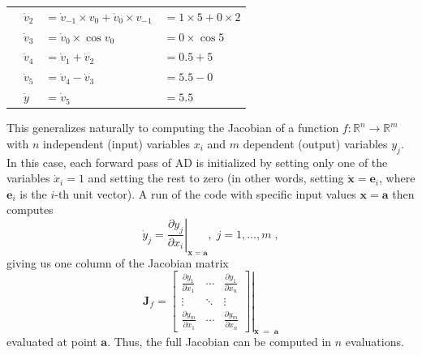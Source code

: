 \documentclass[twoside,11pt]{article}
\begin{document}
\begin{table}
\begin{minipage}[c]{0.52\textwidth}
{\begin{tabularx}{\textwidth}{p{0.2mm}p{2mm}p{28mm}X}
      & $\dot{v}_2$ & $=\dot{v}_{-1} \times v_0 + \dot{v}_0 \times v_{-1}$ & $=1 \times 5 + 0 \times 2$\\
      & $\dot{v}_3$ & $=\dot{v}_0 \times \cos{v_0}$ & $=0 \times \cos{5}$\\
      & $\dot{v}_4$ & $=\dot{v}_1+\dot{v}_2$ & $=0.5+5$\\
      & $\dot{v}_5$ & $=\dot{v}_4-\dot{v}_3$ & $=5.5-0$\\
      \cmidrule{2-4}
      & \boldmath$\dot{y}$ & \boldmath$=\dot{v}_5$ & \boldmath$=5.5$\\
      \bottomrule
      \end{tabularx}}
  \end{minipage}
\end{table}

This generalizes naturally to computing the Jacobian of a function $f : \mathbb{R}^n \to \mathbb{R}^m$ with $n$ independent (input) variables $x_i$ and $m$ dependent (output) variables $y_j$. In this case, each forward pass of AD is initialized by setting only one of the variables $\dot{x}_i=1$ and setting the rest to zero (in other words, setting $\dot{\mathbf{x}} = \mathbf{e}_i$, where $\mathbf{e}_i$ is the $i$-th unit vector). A run of the code with specific input values $\mathbf{x}=\mathbf{a}$ then computes
\begin{equation*}
\dot{y}_j = \left.\frac{\partial y_j}{\partial x_i}\right|_{\mathbf{x}=\mathbf{a}},\;j = 1, \dotsc, m\;,
\end{equation*}
giving us one column of the Jacobian matrix
\begin{equation*}
\mathbf{J}_f = \left. \begin{bmatrix}
                    \frac{\partial y_1}{\partial x_1} & \cdots & \frac{\partial y_1}{\partial x_n} \\
                    \vdots & \ddots & \vdots \\
                    \frac{\partial y_m}{\partial x_1} & \cdots & \frac{\partial y_m}{\partial x_n}
                   \end{bmatrix} \right|_{\mathbf{x}\; = \; \mathbf{a}}
\end{equation*}
evaluated at point $\mathbf{a}$. Thus, the full Jacobian can be computed in $n$ evaluations.
\end{document}
